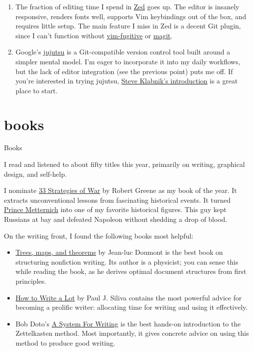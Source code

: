 \documentclass{article}
\begin{document}
\begin{enumerate}
\item
The fraction of editing time I spend in \href{https://zed.dev/}{Zed} goes up.
The editor is insanely responsive, renders fonts well, supports Vim keybindings out of the box, and requires little setup.
The main feature I miss in Zed is a decent Git plugin, since I can’t function without \href{https://github.com/tpope/vim-fugitive}{vim-fugitive} or \href{https://magit.vc/}{magit}.

\item
Google's \href{https://github.com/jj-vcs/jj}{jujutsu} is a Git-compatible version control tool built around a simpler mental model.
I'm eager to incorporate it into my daily workflows, but the lack of editor integration (see the previous point) puts me off.
If you're interested in trying jujutsu, \href{https://steveklabnik.github.io/jujutsu-tutorial/introduction/introduction.html}{Steve Klabnik's introduction} is a great place to start.
\end{enumerate}

\section{books}{Books}

I read and listened to about fifty titles this year, primarily on writing, graphical design, and self-help.

I nominate \href{https://www.goodreads.com/book/show/35289.The_33_Strategies_of_War}{33 Strategies of War} by Robert Greene as my book of the year.
It extracts unconventional lessons from fascinating historical events.
It turned \href{https://en.wikipedia.org/wiki/Klemens_von_Metternich}{Prince Metternich} into one of my favorite historical figures.
This guy kept Russians at bay and defeated Napoleon without shedding a drop of blood.

On the writing front, I found the following books most helpful:
\begin{itemize}
\item
\href{https://www.goodreads.com/book/show/6477103-trees-maps-and-theorems}{Trees, maps, and theorems} by Jean-luc Doumont is the best book on structuring nonfiction writing.
Its author is a physicist; you can sense this while reading the book, as he derives optimal document structures from first principles.
\item
\href{https://www.goodreads.com/book/show/39874447-how-to-write-a-lot}{How to Write a Lot} by Paul J. Siliva contains the most powerful advice for becoming a prolific writer:
allocating time for writing and using it effectively.
\item
Bob Doto's \href{https://www.goodreads.com/book/show/214971755-a-system-for-writing}{A System For Writing} is the best hands-on introduction to the Zettelkasten method.
Most importantly, it gives concrete advice on using this method to produce good writing.
\end{itemize}
\end{document}
